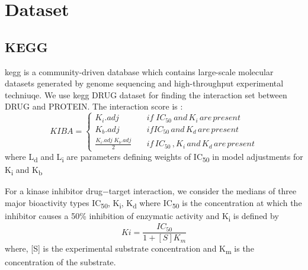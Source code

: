 \section{Dataset}

\subsection{KEGG}
\acrfull{kegg} is a community-driven database which contains large-scale molecular datasets generated by genome sequencing and high-throughput experimental techniuqe.\cite{Kanehisa2000} We use \acrshort{kegg} DRUG dataset for finding the interaction set between DRUG and PROTEIN. The interaction score is :
\begin{equation}
  KIBA = \begin{cases}
    K_i . {adj} & \quad {if} \; {IC_{50}\: and\, K_i \,are\, present} \\
    K_b.{adj} & \quad {if}  {IC_{50} \, and \, K_d \, are \, present} \\
    \frac{K_i . {adj} \; K_b.{adj}}{2} & \quad {if\, IC_{50}\,,K_i\, and \,K_d\, are\, present}
  \end{cases}
   \label{eq:kiba}
\end{equation}
where L\textsubscript{d} and L\textsubscript{i} are parameters defining weights of IC\textsubscript{50} in model adjustments for K\textsubscript{i} and K\textsubscript{b} 

For a kinase inhibitor drug−target interaction, we consider the medians of three major bioactivity types IC\textsubscript{50}, K\textsubscript{i}, K\textsubscript{d} where
IC\textsubscript{50} \cite{Tang2013} is the concentration at which the inhibitor causes a 50\% inhibition of enzymatic activity and K\textsubscript{i} is defined by \begin{equation}
    Ki = \frac{IC_{50}} {1 + [S]  K_m}
    \label{eq:ki}
\end{equation} 
where,  [{S}] is the experimental substrate concentration and K\textsubscript{m} is the concentration of the substrate.

